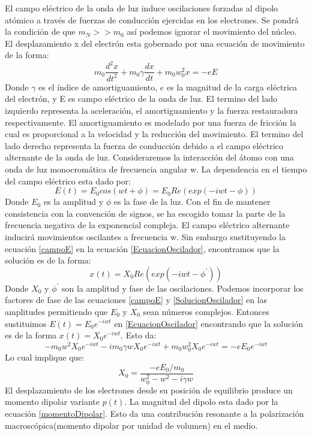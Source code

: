 \documentclass[a4paper,openright,12pt]{book}
\begin{document}
El campo eléctrico de la onda de luz induce oscilaciones forzadas al dipolo atómico a través de fuerzas de conducción ejercidas en los electrones. Se pondrá la condición de que $m_{N}>>m_{0}$ así podemos ignorar el movimiento del núcleo. El desplazamiento x del electrón esta gobernado por una ecuación de movimiento de la forma:
\begin{equation}\label{EcuacionOscilador}
m_{0}\frac{d^{2}x}{dt^{2}}+m_{0}\gamma\frac{dx}{dt}+m_{0}w_{0}^{2}x=-eE
\end{equation}
Donde $\gamma$ es el índice de amortiguamiento, $e$ es la magnitud de la carga eléctrica del electrón, y E es campo eléctrico de la onda de luz. El termino del lado izquierdo representa la aceleración, el amortiguamiento y la fuerza restauradora respectivamente. El amortiguamiento es modelado por una fuerza de fricción la cual es proporcional a la velocidad y la reducción del movimiento. El termino del lado derecho representa la fuerza de conducción debido a el campo eléctrico alternante de la onda de luz.
Consideraremos la interacción del átomo con una onda de luz monocromática de frecuencia angular w. La dependencia en el tiempo del campo eléctrico esta dado por:
\begin{equation}\label{campoE}
E(t)=E_{0}cos(wt+\phi)=E_{0}Re(exp(-iwt-\phi))
\end{equation}
Donde $E_{0}$ es la amplitud y $\phi$ es la fase de la luz. Con el fin de mantener consistencia con la convención de signos, se ha escogido tomar la parte de la frecuencia negativa de la exponencial compleja.
El campo eléctrico alternante inducirá movimientos oscilantes a frecuencia w. Sin embargo sustituyendo la ecuación \ref{campoE} en la ecuación \ref{EcuacionOscilador}, encontramos que la solución es de la forma:
\begin{equation}\label{SolucionOscilador}
x(t)=X_{0}Re(exp(-iwt-\phi^{'}))
\end{equation}
Donde $X_{0}$ y $\phi^{'}$ son la amplitud y fase de las oscilaciones. Podemos incorporar los factores de fase de las ecuaciones \ref{campoE} y \ref{SolucionOscilador} en las amplitudes permitiendo que $E_{0}$ y $X_{0}$ sean números complejos. Entonces sustituimos $E(t)=E_{0}e^{-iwt}$ en \ref{EcuacionOscilador} encontrando que la solución es de la forma $x(t)=X_{0}e^{-iwt}$. Esto da:
\begin{equation}
-m_{0}w^{2}X_{0}e^{-iwt}-im_{0}\gamma wX_{0}e^{-iwt}+m_{0}w_{0}^{2}X_{0}e^{-iwt}=-eE_{0}e^{-iwt}
\end{equation}
Lo cual implique que:
\begin{equation}
X_{0}=\frac{-e E_{0}/m_{0}}{w_{0}^{2}-w^{2}-i\gamma w}
\end{equation}
El desplazamiento de los electrones desde su posición de equilibrio produce un momento dipolar variante $p(t)$. La magnitud del dipolo esta dado por la ecuación \ref{momentoDipolar}. Esto da una contribución resonante a la polarización macroscópica(momento dipolar por unidad de volumen) en el medio.
\end{document}
